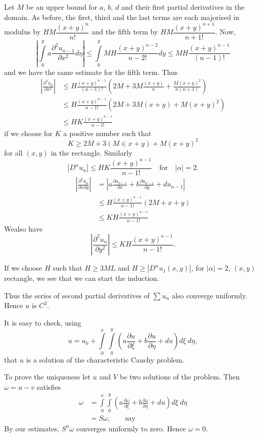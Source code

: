 Let $M$ be an upper bound for $a$, $b$, $d$ and their first partial derivatives in the domain. As before, the first, third and the last terms are each majorised in modulus by $HM\dfrac{(x+y)^{n}}{n!}$ and the fifth term by $HM\dfrac{(x+y)^{n+1}}{n+1!}$. Now,
$$
\left| \int\limits^{y}_{0}a\frac{\partial^{2}u_{n-1}}{\partial x^{2}}d\eta \right|\leq \int\limits^{y}_{0}MH\frac{(x+y)^{n-2}}{n-2!}dy\leq MH \frac{(x+y)^{n-1}}{(n-1)!}
$$
and we have the same estimate for the fifth term. Thus
\begin{align*}
\left| \frac{\partial^{2}u_{n}}{\partial x^{2}}\right| &\leq H\frac{(x+y)^{n-1}}{(n-1)!}\left(2M+3M \frac{(x+y)}{n}+\frac{M(x+y)^{2}}{n(n+1)}\right)\\[3pt]
&\leq H\frac{(x+y)^{n-1}}{n-1!}\left(2M+3M(x+y)+M(x+y)^{2}\right)\\[3pt]
&\leq HK \frac{(x+y)^{n-1}}{n-1!}
\end{align*}
if we choose for $K$ a positive number such that
$$
K\geq 2M + 3 (M\in x+y)+M(x+y)^{2}
$$
for all $(x,y)$ in the rectangle. Similarly
$$
|D^{\alpha}u_{n}|\leq HK\frac{(x+y)^{n-1}}{n-1!}\quad\text{for}\quad |\alpha|=2.
$$
\begin{align*}
\left| \frac{\partial^{2}u_{n}}{\partial x\partial y}\right| &= \left| a\frac{\partial u_{n-1}}{\partial x}+b\frac{\partial u_{n-1}}{\partial y}+du_{n-1}\right|\\[3pt]
&\leq H\frac{(x+y)^{n-1}}{n-1!}(2M+x+y)\\[3pt]
&\leq KH \frac{(x+y)^{n-1}}{n-1!}
\end{align*}
We\pageoriginale also have
$$
\left| \frac{\partial^{2}u_{n}}{\partial y^{2}}\right|\leq KH \frac{(x+y)^{n-1}}{n-1!}.
$$

If we choose $H$ such that $H\geq 3ML$ and $H\geq |D^{\alpha}u_{1}(x,y)|$, for $|\alpha|=2$, $(x,y)$ rectangle, we see that we can start the induction.

Thus the series of second partial derivatives of $\sum u_{n}$ also converge uniformly. Hence $u$ is $C^{2}$.

It is easy to check, using
$$
u=u_{0}+\int\limits^{x}_{0}\int\limits^{y}_{0}\left(a\frac{\partial u}{\partial \xi}+b\frac{\partial u}{\partial \eta}+du\right)d\xi \ d\eta,
$$
that $u$ is a solution of the characteristic Cauchy problem.

To prove the uniqueness let $u$ and $V$ be two solutions of the problem. Then $\omega=u-v$ satisfies
\begin{align*}
\omega &= \int\limits^{x}_{0}\int\limits^{y}_{0}\left(a\frac{\partial \omega}{\partial \xi}+b\frac{\partial \omega}{\partial \eta}+du\right)d\xi \ d\eta\\[4pt]
&= S\omega,\qquad\text{say}
\end{align*}
By our estimates, $S^{n}\omega$ converges uniformly to zero. Hence $\omega=0$.

